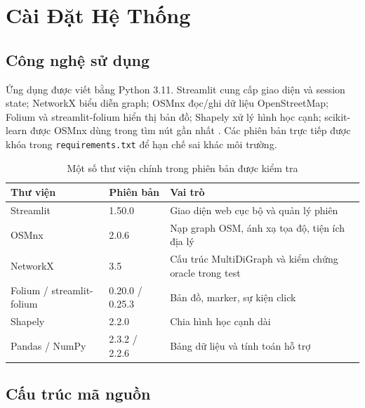 \chapter{Cài Đặt Hệ Thống}

\section{Công nghệ sử dụng}

Ứng dụng được viết bằng Python 3.11. Streamlit cung cấp giao diện và session
state; NetworkX biểu diễn graph; OSMnx đọc/ghi dữ liệu OpenStreetMap; Folium và
streamlit-folium hiển thị bản đồ; Shapely xử lý hình học cạnh; scikit-learn được
OSMnx dùng trong tìm nút gần nhất \cite{networkx,streamlit}. Các phiên bản trực
tiếp được khóa trong \texttt{requirements.txt} để hạn chế sai khác môi trường.

\begin{table}[H]
\centering
\caption{Một số thư viện chính trong phiên bản được kiểm tra}
\begin{tabularx}{\linewidth}{p{4.0cm}p{2.2cm}Y}
\toprule
\textbf{Thư viện} & \textbf{Phiên bản} & \textbf{Vai trò} \\
\midrule
Streamlit & 1.50.0 & Giao diện web cục bộ và quản lý phiên \\
OSMnx & 2.0.6 & Nạp graph OSM, ánh xạ tọa độ, tiện ích địa lý \\
NetworkX & 3.5 & Cấu trúc MultiDiGraph và kiểm chứng oracle trong test \\
Folium / streamlit-folium & 0.20.0 / 0.25.3 & Bản đồ, marker, sự kiện click \\
Shapely & 2.2.0 & Chia hình học cạnh dài \\
Pandas / NumPy & 2.3.2 / 2.2.6 & Bảng dữ liệu và tính toán hỗ trợ \\
\bottomrule
\end{tabularx}
\end{table}

\section{Cấu trúc mã nguồn}

